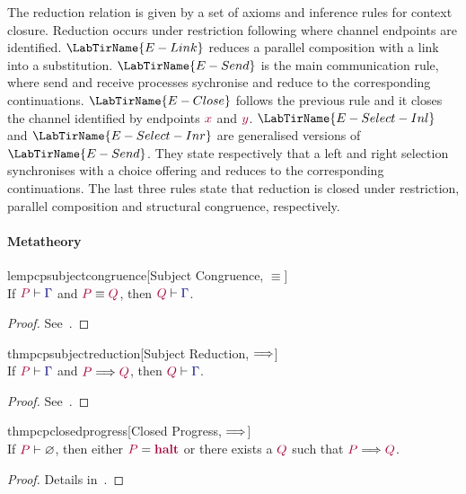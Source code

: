 \documentclass[main.tex]{subfiles}
\begin{document}
The reduction relation is given by a set of axioms and inference rules for context closure. Reduction occurs under restriction following \cite{dardhagay18} where channel endpoints are identified.
$\LabTirName{E-Link}$ reduces a parallel composition with a link into a substitution. $\LabTirName{E-Send}$ is the main communication rule, where send and receive processes sychronise and reduce to the corresponding continuations. $\LabTirName{E-Close}$ follows the previous rule and it closes the channel identified by endpoints $\tm{x}$ and $\tm{y}$. $\LabTirName{E-Select-Inl}$ and $\LabTirName{E-Select-Inr}$ are generalised versions of $\LabTirName{E-Send}$. They state respectively that a left and right selection synchronises with a choice offering and reduces to the corresponding continuations. The last three rules state that reduction is closed under restriction, parallel composition and structural congruence, respectively. 


\paragraph{Metatheory}

\begin{restatablelemma}{lempcpsubjectcongruence}[Subject Congruence, $\equiv$]
  \label{lem:pcp-subject-congruence}
  \hfill\\%
  If $\seq{P}{\ty{\Gamma}}$ and $\tm{P}\equiv\tm{Q}$,
  then $\seq{Q}{\ty{\Gamma}}$.
\end{restatablelemma}
\begin{proof}
  See~\cite{dardhagay18}.
\end{proof}

\begin{restatabletheorem}{thmpcpsubjectreduction}[Subject Reduction, $\Longrightarrow$]
  \label{thm:pcp-subject-reduction}
  \hfill\\%
  If $\seq{P}{\ty{\Gamma}}$ and $\tm{P}\red\tm{Q}$, then $\seq{Q}{\ty{\Gamma}}$.
\end{restatabletheorem}
\begin{proof}
  See~\cite{dardhagay18}.
\end{proof}

\begin{restatabletheorem}{thmpcpclosedprogress}[Closed Progress, $\Longrightarrow$]
  \label{thm:pcp-closed-progress}
  \hfill\\%
  If $\seq{P}{\emptyenv}$, then either $\tm{P}=\tm{\halt}$ or there exists a $\tm{Q}$ such that $\tm{P}\red\tm{Q}$.
\end{restatabletheorem}
\begin{proof}
  Details in~.
\end{proof}
\end{document}
